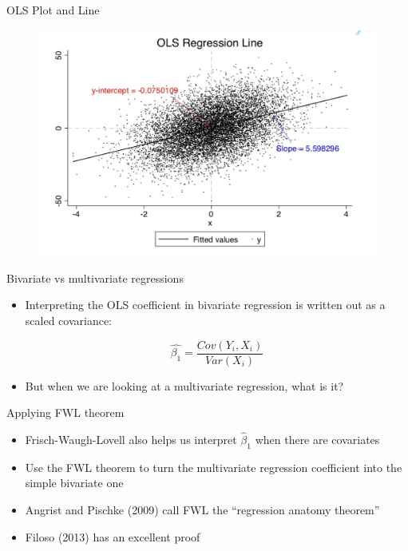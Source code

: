 \documentclass{beamer}
\begin{document}
\begin{frame}{OLS Plot and Line}

\begin{figure}[!t]\centering
\includegraphics[scale=0.4]{./lecture_includes/ols_line}
\end{figure}

\end{frame}

\begin{frame}{Bivariate vs multivariate regressions}

\begin{itemize}

\item Interpreting the OLS coefficient in bivariate regression is written out as a scaled covariance:

 $$\widehat{\beta_1}=\frac{Cov(Y_i,X_i)}{Var(X_i)}$$
 
 \item But when we are looking at a multivariate regression, what is it?
 
 \end{itemize}
 
 \end{frame}
 
 \begin{frame}{Applying FWL theorem}

\begin{itemize}
\item Frisch-Waugh-Lovell also helps us interpret $\widehat{\beta}_1$ when there are covariates
 \item Use the FWL theorem to turn the multivariate regression coefficient into the simple bivariate one
\item Angrist and Pischke (2009) call FWL the ``regression anatomy theorem''
\item Filoso (2013) has an excellent proof
\end{itemize}

\end{frame}
\end{document}
